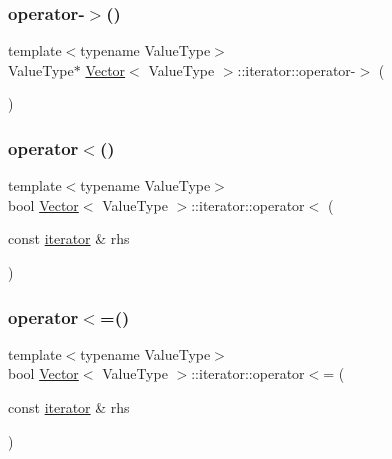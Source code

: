 \mbox{\label{classVector_1_1iterator_a6339a188a6f0fca25c579a4a5647de04}} 
\subsubsection{\texorpdfstring{operator-\/$>$()}{operator->()}}
{\footnotesize\ttfamily template$<$typename Value\+Type$>$ \\
Value\+Type$\ast$ \mbox{\hyperlink{classVector}{Vector}}$<$ Value\+Type $>$\+::iterator\+::operator-\/$>$ (\begin{DoxyParamCaption}{ }\end{DoxyParamCaption})\hspace{0.3cm}{\ttfamily [inline]}}

\mbox{\label{classVector_1_1iterator_a279a96f81826b964bf9ac40e7ddfdf49}} 
\subsubsection{\texorpdfstring{operator$<$()}{operator<()}}
{\footnotesize\ttfamily template$<$typename Value\+Type$>$ \\
bool \mbox{\hyperlink{classVector}{Vector}}$<$ Value\+Type $>$\+::iterator\+::operator$<$ (\begin{DoxyParamCaption}\item[{const \mbox{\hyperlink{classVector_1_1iterator}{iterator}} \&}]{rhs }\end{DoxyParamCaption})\hspace{0.3cm}{\ttfamily [inline]}}

\mbox{\label{classVector_1_1iterator_ad8383e8041e8c1f3e62d46475cdab6a7}} 
\subsubsection{\texorpdfstring{operator$<$=()}{operator<=()}}
{\footnotesize\ttfamily template$<$typename Value\+Type$>$ \\
bool \mbox{\hyperlink{classVector}{Vector}}$<$ Value\+Type $>$\+::iterator\+::operator$<$= (\begin{DoxyParamCaption}\item[{const \mbox{\hyperlink{classVector_1_1iterator}{iterator}} \&}]{rhs }\end{DoxyParamCaption})\hspace{0.3cm}{\ttfamily [inline]}}

